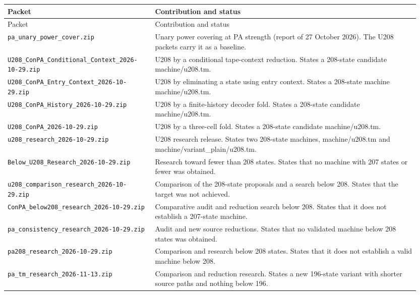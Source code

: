 \footnotesize
\begin{longtable}{@{}p{0.34\linewidth}p{0.61\linewidth}@{}}
\toprule Packet & Contribution and status\\\midrule
\endfirsthead
\toprule Packet & Contribution and status\\\midrule
\endhead
\bottomrule\endfoot
\nolinkurl{pa_unary_power_cover.zip} & Unary power covering at PA strength (report of 27 October 2026). The U208 packets carry it as a baseline. \\[5pt]
\nolinkurl{U208_ConPA_Conditional_Context_2026-10-29.zip} & U208 by a conditional tape-context reduction. States a 208-state candidate machine/u208.tm. \\[5pt]
\nolinkurl{U208_ConPA_Entry_Context_2026-10-29.zip} & U208 by eliminating a state using entry context. States a 208-state machine machine/u208.tm. \\[5pt]
\nolinkurl{U208_ConPA_History_2026-10-29.zip} & U208 by a finite-history decoder fold. States a 208-state candidate machine/u208.tm. \\[5pt]
\nolinkurl{U208_ConPA_2026-10-29.zip} & U208 by a three-cell fold. States a 208-state candidate machine/u208.tm. \\[5pt]
\nolinkurl{u208_research_2026-10-29.zip} & U208 research release. States two 208-state machines, machine/u208.tm and machine/variant\_plain/u208.tm. \\[5pt]
\nolinkurl{Below_U208_Research_2026-10-29.zip} & Research toward fewer than 208 states. States that no machine with 207 states or fewer was obtained. \\[5pt]
\nolinkurl{u208_comparison_research_2026-10-29.zip} & Comparison of the 208-state proposals and a search below 208. States that the target was not achieved. \\[5pt]
\nolinkurl{ConPA_below208_research_2026-10-29.zip} & Comparative audit and reduction search below 208. States that it does not establish a 207-state machine. \\[5pt]
\nolinkurl{pa_consistency_research_2026-10-29.zip} & Audit and new source reductions. States that no validated machine below 208 states was obtained. \\[5pt]
\nolinkurl{pa208_research_2026-10-29.zip} & Comparison and research below 208 states. States that it does not establish a valid machine below 208. \\[5pt]
\nolinkurl{pa_tm_research_2026-11-13.zip} & Comparison and reduction research. States a new 196-state variant with shorter source paths and nothing below 196. \\[5pt]

\end{longtable}

